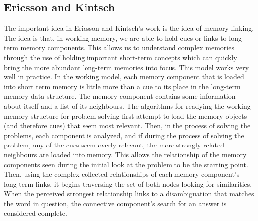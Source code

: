 \subsection{Ericsson and Kintsch}

The important idea in Ericsson and Kintsch's work is the idea of memory linking.
The idea is that, in working memory, we are able to hold cues or links to long-term memory components.  This allows us to understand complex memories through
the use of holding important short-term concepts which can quickly bring the
more abundant long-term memories into focus.  This model works very well in
practice.  In the working model, each memory component that is loaded into short
term memory is little more than a cue to its place in the long-term memory data
structure.  The memory component contains some information about itself and a
list of its neighbours.  The algorithms for readying the working-memory
structure for problem solving first attempt to load the memory objects (and
therefore cues) that seem most relevant.  Then, in the process of solving the
problems, each component is analyzed, and if during the process of solving the
problem, any of the cues seem overly relevant, the more strongly related
neighbours are loaded into memory.  This allows the relationship of the memory
components seen during the initial look at the problem to be the starting point.
Then, using the complex collected relationships of each memory component's long-term links, it begins traversing the set of both nodes looking for similarities.
When the perceived strongest relationship links to a disambiguation that matches
the word in question, the connective component's search for an answer is
considered complete.


